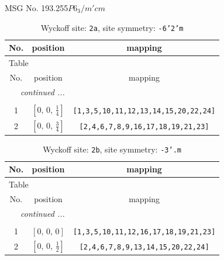 \documentclass[fleqn,8pt]{jsarticle}
\begin{document}
\setcounter{MaxMatrixCols}{32}

\renewcommand{\tablename}{Table~}
\renewcommand{\figurename}{Figure~}
\begin{center}
\LARGE
MSG No. 193.255\quad$P6_{3}/m'cm$
\end{center}
\renewcommand{\arraystretch}{1.2}
\begin{longtable}{ccc}
\caption{Wyckoff site: {\tt 2a}, site symmetry: {\tt -6'2'm}}
 \\
 \hline \hline
No. & position & mapping \\ \hline \endfirsthead

\multicolumn{2}{l}{\tablename\ \thetable{}} \\
 \hline \hline
No. & position & mapping \\ \hline \endhead

 \hline \hline
\multicolumn{2}{r}{\footnotesize\it continued ...} \\ \endfoot

 \hline \hline
\multicolumn{2}{r}{} \\ \endlastfoot

1 & $\left[ 0,\, 0,\, \frac{1}{4} \right]$ & {\tt [1,3,5,10,11,12,13,14,15,20,22,24]} \\ \hline
2 & $\left[ 0,\, 0,\, \frac{3}{4} \right]$ & {\tt [2,4,6,7,8,9,16,17,18,19,21,23]} \\
\end{longtable}
\renewcommand{\arraystretch}{1.2}
\begin{longtable}{ccc}
\caption{Wyckoff site: {\tt 2b}, site symmetry: {\tt -3'.m}}
 \\
 \hline \hline
No. & position & mapping \\ \hline \endfirsthead

\multicolumn{2}{l}{\tablename\ \thetable{}} \\
 \hline \hline
No. & position & mapping \\ \hline \endhead

 \hline \hline
\multicolumn{2}{r}{\footnotesize\it continued ...} \\ \endfoot

 \hline \hline
\multicolumn{2}{r}{} \\ \endlastfoot

1 & $\left[ 0,\, 0,\, 0 \right]$ & {\tt [1,3,5,10,11,12,16,17,18,19,21,23]} \\ \hline
2 & $\left[ 0,\, 0,\, \frac{1}{2} \right]$ & {\tt [2,4,6,7,8,9,13,14,15,20,22,24]} \\
\end{longtable}
\end{document}
